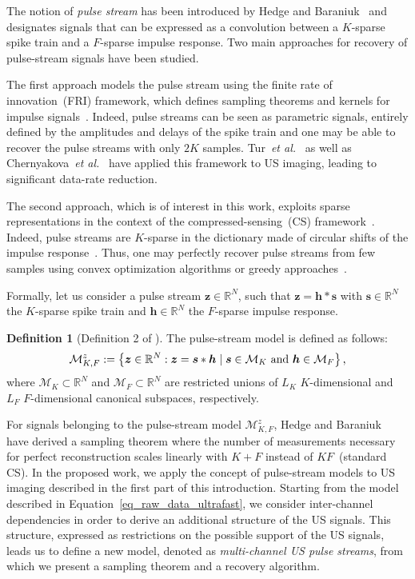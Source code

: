 \documentclass[journal]{IEEEtran}
\newcommand{\etal}{\textit{et al.}}
\newcommand{\vect}[1]{\bm{#1}}
\theoremstyle{definition}
\newtheorem{defn}{Definition}
\begin{document}
The notion of \textit{pulse stream} has been introduced by Hedge and Baraniuk~\cite{Hedge_TSP_2011} and designates signals that can be expressed as a convolution between a $K$-sparse spike train and a $F$-sparse impulse response. Two main approaches for recovery of pulse-stream signals have been studied. 

The first approach models the pulse stream using the finite rate of innovation~(FRI) framework, which defines sampling theorems and kernels for impulse signals~\cite{Vetterli_TSP_2002}. Indeed, pulse streams can be seen as parametric signals, entirely defined by the amplitudes and delays of the spike train and one may be able to recover the pulse streams with only $2K$ samples. Tur~\etal{}~\cite{Tur_TSP_2012} as well as Chernyakova~\etal{}~\cite{Chernyakova2014} have applied this framework to US imaging, leading to significant data-rate reduction.

The second approach, which is of interest in this work, exploits sparse representations in the context of the compressed-sensing~(CS) framework~\cite{Candes_SPM_2008}. Indeed, pulse streams are $K$-sparse in the dictionary made of circular shifts of the impulse response~\cite{Naini_ICASSP_2009}. Thus, one may perfectly recover pulse streams from few samples using convex optimization algorithms or greedy approaches~\cite{Hedge_TSP_2011, Naini_ICASSP_2009, Tsagkatakis_ICASSP_2014}.

Formally, let us consider a pulse stream $\vect{z} \in \mathbb{R}^N$, such that $\vect{z} = \vect{h} \ast \vect{s}$ with $\vect{s} \in \mathbb{R}^N$ the $K$-sparse spike train and $\vect{h} \in \mathbb{R}^N$ the $F$-sparse impulse response.
\begin{defn}[Definition 2 of \cite{Hedge_TSP_2011}]	
The pulse-stream model is defined as follows:
\begin{equation}
\label{eq_pulse_stream_model}
\mathcal{M}^z_{K,F}:=\left\lbrace \vect{z} \in \mathbb{R}^N: \vect{z} = \vect{s} \ast \vect{h} \; | \; \vect{s} \in \mathcal{M}_K \textnormal{ and } \vect{h} \in \mathcal{M}_F \right \rbrace,
\end{equation}
where $\mathcal{M}_K \subset \mathbb{R}^N$ and $\mathcal{M}_F \subset \mathbb{R}^N$ are restricted unions of $L_K$ $K$-dimensional and $L_F$ $F$-dimensional canonical subspaces, respectively.
\end{defn} 


For signals belonging to the pulse-stream model $\mathcal{M}^z_{K,F}$, Hedge and Baraniuk~\cite{Hedge_TSP_2011} have derived a sampling theorem where the number of measurements necessary for perfect reconstruction scales linearly with $K + F$ instead of $KF$~(standard CS). In the proposed work, we apply the concept of pulse-stream models to US imaging described in the first part of this introduction. Starting from the model described in Equation~\eqref{eq_raw_data_ultrafast}, we consider inter-channel dependencies in order to derive an additional structure of the US signals. This structure, expressed as restrictions on the possible support of the US signals, leads us to define a new model, denoted as \textit{multi-channel US pulse streams}, from which we present a sampling theorem and a recovery algorithm.
\end{document}
